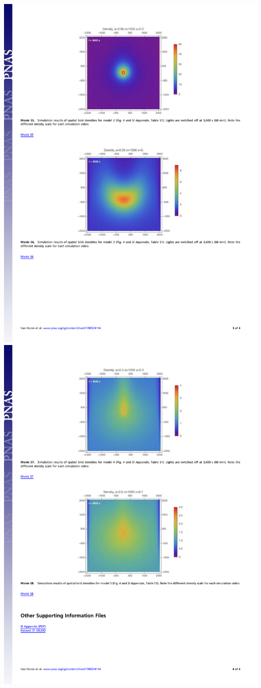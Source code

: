 \documentclass[a4paper, twoside]{templates/ociamthesis}
\begin{document}
\includegraphics[width=1\linewidth]{pdf_chapters/lights/lights_supp_crop_Part03}
\includegraphics[width=1\linewidth]{pdf_chapters/lights/lights_supp_crop_Part04}
\end{document}
